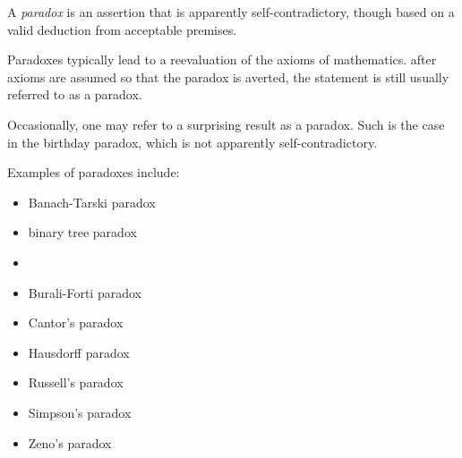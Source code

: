 \documentclass[12pt]{article}
\begin{document}
A {\sl paradox\/} is an assertion that is apparently self-contradictory, though based on a valid deduction from acceptable premises.

Paradoxes typically lead to a reevaluation of the axioms of mathematics.   after axioms are assumed so that the paradox is averted, the statement is still usually referred to as a paradox.

Occasionally, one may refer to a surprising result as a paradox.  Such is the case in the birthday paradox, which is not apparently self-contradictory.

Examples of paradoxes include:

\begin{itemize}
\item Banach-Tarski paradox
\item binary tree paradox
\item {}
\item Burali-Forti paradox
\item Cantor's paradox
\item Hausdorff paradox
\item Russell's paradox
\item Simpson's paradox
\item Zeno's paradox
\end{itemize}


\end{document}
